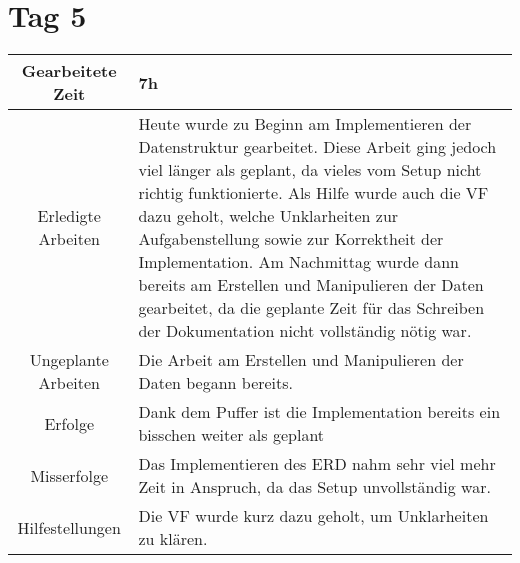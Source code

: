 \section{Tag 5}
\begin{tabularx}{\textwidth}[H]{|c|X|}
  \hline
  Gearbeitete Zeit & 7h \\ \hline
  Erledigte Arbeiten & Heute wurde zu Beginn am Implementieren der Datenstruktur gearbeitet. Diese Arbeit ging jedoch
  viel länger als geplant, da vieles vom Setup nicht richtig funktionierte. Als Hilfe wurde auch die VF dazu geholt,
  welche Unklarheiten zur Aufgabenstellung sowie zur Korrektheit der Implementation. \newline
  Am Nachmittag wurde dann bereits am Erstellen und Manipulieren der Daten gearbeitet, da die geplante Zeit für das 
  Schreiben der Dokumentation nicht vollständig nötig war. \\ \hline
  Ungeplante Arbeiten & Die Arbeit am Erstellen und Manipulieren der Daten begann bereits. \\ \hline
  Erfolge & Dank dem Puffer ist die Implementation bereits ein bisschen weiter als geplant \\ \hline
  Misserfolge & Das Implementieren des ERD nahm sehr viel mehr Zeit in Anspruch, da das Setup unvollständig war. \\ \hline
  Hilfestellungen & Die VF wurde kurz dazu geholt, um Unklarheiten zu klären. \\ \hline
\end{tabularx}

\newpage

